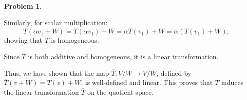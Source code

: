 \documentclass[12pt]{article}
\theoremstyle{definition}
\newtheorem{problem}{Problem}
\begin{document}
\begin{problem}
\begin{solution}
        Similarly, for scalar multiplication:
        \[\overline{T}(\alpha v_1 + W) = T(\alpha v_1) + W = \alpha T(v_1) + W = \alpha (T(v_1) + W),\]
        showing that \( \overline{T} \) is homogeneous.
    
        Since \( \overline{T} \) is both additive and homogeneous, it is a linear transformation.
    
        Thus, we have shown that the map \( \overline{T}: V/W \to V/W \), defined by \( \overline{T}(v + W) = T(v) + W \), is well-defined and linear. This proves that \( T \) induces the linear transformation \( \overline{T} \) on the quotient space.

    \end{solution}
\end{problem}
\end{document}
